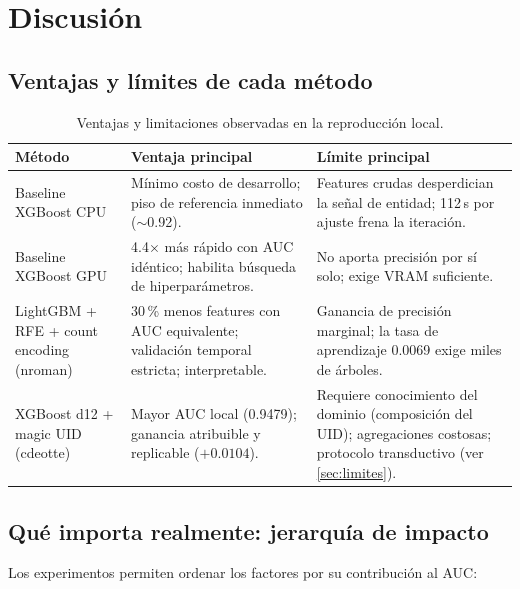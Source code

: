 \chapter{Discusión}
\label{cap:discusion}

\section{Ventajas y límites de cada método}

\begin{table}[ht]
  \centering
  \caption{Ventajas y limitaciones observadas en la reproducción local.}
  \label{tab:ventajas}
  \small
  \begin{tabular}{p{}p{}p{}}
    \toprule
    Método & Ventaja principal & Límite principal \\
    \midrule
    Baseline XGBoost CPU &
      Mínimo costo de desarrollo; piso de referencia inmediato ($\sim$0.92). &
      Features crudas desperdician la señal de entidad; 112\,s por ajuste frena la iteración. \\
    \addlinespace
    Baseline XGBoost GPU &
      4.4$\times$ más rápido con AUC idéntico; habilita búsqueda de hiperparámetros. &
      No aporta precisión por sí solo; exige VRAM suficiente. \\
    \addlinespace
    LightGBM + RFE + count encoding (nroman) &
      30\,\% menos features con AUC equivalente; validación temporal estricta; interpretable. &
      Ganancia de precisión marginal; la tasa de aprendizaje 0.0069 exige miles de árboles. \\
    \addlinespace
    XGBoost d12 + magic UID (cdeotte) &
      Mayor AUC local (0.9479); ganancia atribuible y replicable ($+0.0104$). &
      Requiere conocimiento del dominio (composición del UID); agregaciones costosas; protocolo
      transductivo (ver \cref{sec:limites}). \\
    \bottomrule
  \end{tabular}
\end{table}

\section{Qué importa realmente: jerarquía de impacto}

Los experimentos permiten ordenar los factores por su contribución al AUC:

